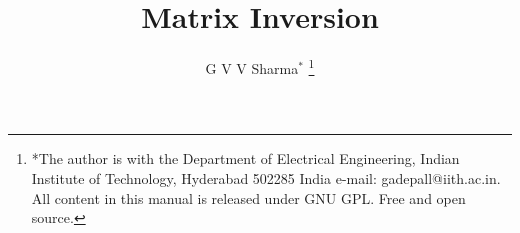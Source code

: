 \documentclass[journal,12pt,twocolumn]{IEEEtran}
\begin{document}
\let\StandardTheFigure\thefigure
\let\vec\mathbf
\renewcommand{\thefigure}{\theproblem}



\def\putbox#1#2#3{\makebox[0in][l]{\makebox[#1][l]{}\raisebox{\baselineskip}[0in][0in]{\raisebox{#2}[0in][0in]{#3}}}}
     \def\rightbox#1{\makebox[0in][r]{#1}}
     \def\centbox#1{\makebox[0in]{#1}}
     \def\topbox#1{\raisebox{-\baselineskip}[0in][0in]{#1}}
     \def\midbox#1{\raisebox{-0.5\baselineskip}[0in][0in]{#1}}

\vspace{3cm}

\title{
Matrix Inversion
}
\author{ G V V Sharma$^{*}$%
	\thanks{*The author is with the Department
		of Electrical Engineering, Indian Institute of Technology, Hyderabad
		502285 India e-mail:  gadepall@iith.ac.in. All content in this manual is released under GNU GPL.  Free and open source.}
	
}	


%
%
%

% 
%
\end{document}
